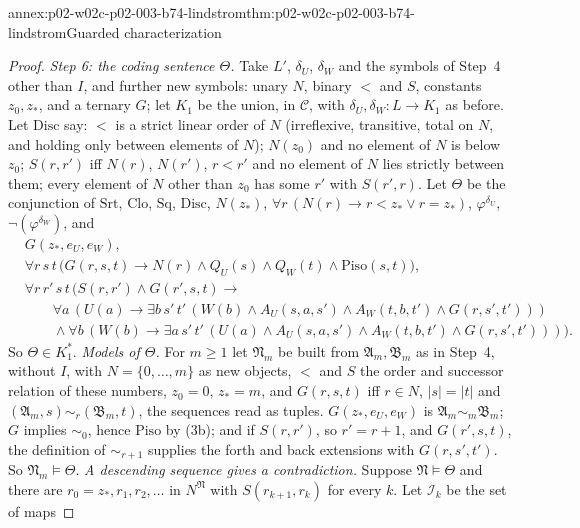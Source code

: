 \begin{annexitem}{annex:p02-w02c-p02-003-b74-lindstrom}{thm:p02-w02c-p02-003-b74-lindstrom}{Guarded characterization}
\begin{proof}
\emph{Step 6: the coding sentence \(\Theta\).}  Take \(L'\), \(\delta_U\),
\(\delta_W\) and the symbols of Step~4 other than \(I\), and further new
symbols: unary \(N\), binary \(<\) and \(S\), constants \(z_0,z_\ast\), and a
ternary \(G\); let \(K_1\) be the union, in \(\mathcal C\), with
\(\delta_U,\delta_W:L\to K_1\) as before.  Let \(\mathrm{Disc}\) say:
\(<\) is a strict linear order of \(N\) (irreflexive, transitive, total on
\(N\), and holding only between elements of \(N\)); \(N(z_0)\) and no
element of \(N\) is below \(z_0\); \(S(r,r')\) iff \(N(r)\), \(N(r')\),
\(r<r'\) and no element of \(N\) lies strictly between them; every element
of \(N\) other than \(z_0\) has some \(r'\) with \(S(r',r)\).  Let
\(\Theta\) be the conjunction of \(\mathrm{Srt}\), \(\mathrm{Clo}\),
\(\mathrm{Sq}\), \(\mathrm{Disc}\), \(N(z_\ast)\),
\(\forall r\,(N(r)\to r<z_\ast\lor r=z_\ast)\), \(\varphi^{\delta_U}\),
\(\neg(\varphi^{\delta_W})\), and
\[
\begin{aligned}
 &G(z_\ast,e_U,e_W),\\
 &\forall r\,s\,t\,\bigl(G(r,s,t)\to N(r)\land Q_U(s)\land Q_W(t)\land\mathrm{Piso}(s,t)\bigr),\\
 &\forall r\,r'\,s\,t\,\bigl(S(r,r')\land G(r',s,t)\to{}\\
 &\qquad\forall a\,(U(a)\to\exists b\,s'\,t'\,(W(b)\land A_U(s,a,s')\land A_W(t,b,t')\land G(r,s',t')))\\
 &\qquad\land\forall b\,(W(b)\to\exists a\,s'\,t'\,(U(a)\land A_U(s,a,s')\land A_W(t,b,t')\land G(r,s',t')))\bigr).
\end{aligned}
\]
So \(\Theta\in K_1^{\ast}\).  \emph{Models of \(\Theta\).}  For \(m\geq1\)
let \(\mathfrak N_m\) be built from \(\mathfrak A_m,\mathfrak B_m\) as in
Step~4, without \(I\), with \(N=\{0,\ldots,m\}\) as new objects, \(<\) and
\(S\) the order and successor relation of these numbers, \(z_0=0\),
\(z_\ast=m\), and \(G(r,s,t)\) iff \(r\in N\), \(\lvert s\rvert=\lvert
t\rvert\) and \((\mathfrak A_m,s)\sim_r(\mathfrak B_m,t)\), the sequences
read as tuples.  \(G(z_\ast,e_U,e_W)\) is \(\mathfrak A_m\sim_m\mathfrak
B_m\); \(G\) implies \(\sim_0\), hence \(\mathrm{Piso}\) by (3b); and if
\(S(r,r')\), so \(r'=r+1\), and \(G(r',s,t)\), the definition of
\(\sim_{r+1}\) supplies the forth and back extensions with \(G(r,s',t')\).
So \(\mathfrak N_m\models\Theta\).  \emph{A descending sequence gives a
contradiction.}  Suppose \(\mathfrak N\models\Theta\) and there are
\(r_0=z_\ast,r_1,r_2,\ldots\) in \(N^{\mathfrak N}\) with
\(S(r_{k+1},r_k)\) for every \(k\).  Let \(\mathcal I_k\) be the set of maps

\end{proof}
\end{annexitem}
